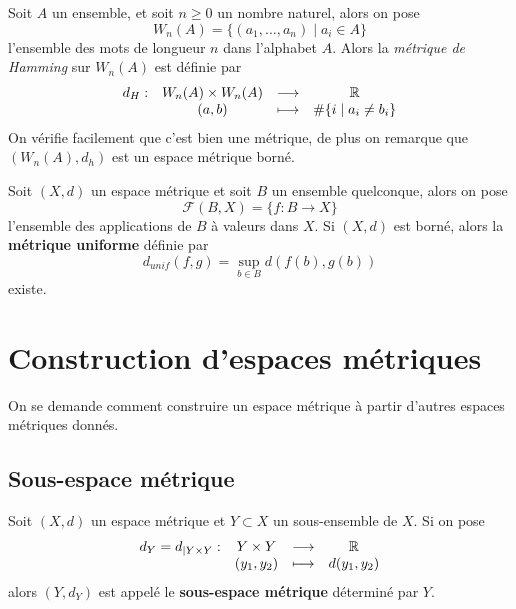 

\begin{exemple} \label{ex: Métrique de Hamming}
Soit $A$ un ensemble, et soit $n \geqslant 0$ un nombre naturel, alors on pose
\[
W_n(A) = \{ (a_1, \ldots, a_n) \mid a_i \in A \}
\]	
l'ensemble des mots de longueur $n$ dans l'alphabet $A$. Alors la \emph{métrique de Hamming} sur $W_n(A)$ est définie par
\[
\begin{array}{cccc}
	d_H : & W_n(A) \times W_n(A) & \longrightarrow & \mathbb{R} \\
			& (a,b) & \longmapsto & \# \{ i \mid a_i \neq b_i \}
\end{array}
\]
On vérifie facilement que c'est bien une métrique, de plus on remarque que $(W_n(A), d_h)$ est un espace métrique borné.
\end{exemple}

\begin{exemple}
	Soit $(X,d)$ un espace métrique et soit $B$ un ensemble quelconque, alors on pose 
	\[
	\mathcal F(B, X) = \{ f : B \to X\}
	\]
	l'ensemble des applications de $B$ à valeurs dans $X$. Si $(X,d)$ est borné, alors la \textbf{métrique uniforme} définie par
	\[
	d_{unif}(f,g) = \sup_{b \in B} d(f(b), g(b))
	\]
	existe.
\end{exemple}

\section{Construction d'espaces métriques}
On se demande comment construire un espace métrique à partir d'autres espaces métriques donnés.

\subsection{Sous-espace métrique}

\begin{definition} \label{def: Sous-espace métrique}
	Soit $(X,d)$ un espace métrique et $Y \subset X$ un sous-ensemble de $X$. Si on pose
	\[
	 \begin{array}{cccc}
	 	d_Y = d_{\mid Y \times Y} : & Y \times Y & \longrightarrow & \mathbb{R} \\
	 								& (y_1, y_2) & \longmapsto & d(y_1, y_2)
	 \end{array}
	\]
	alors $(Y, d_Y)$ est appelé le \textbf{sous-espace métrique} déterminé par $Y$.
\end{definition}

